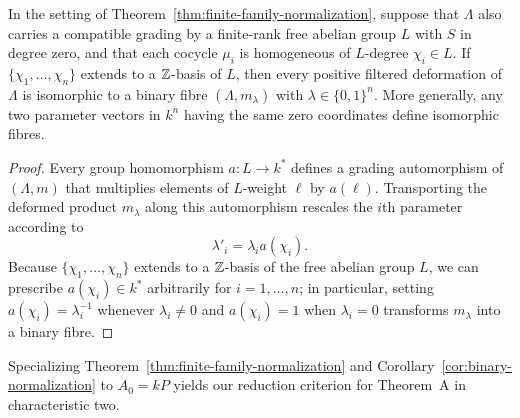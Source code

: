 \begin{corollary}
\label{cor:binary-normalization}
In the setting of Theorem~\ref{thm:finite-family-normalization}, suppose
that $\Lambda$ also carries a compatible grading by a finite-rank free
abelian group $L$ with $S$ in degree zero, and that each cocycle $\mu_i$ is
homogeneous of $L$-degree $\chi_i\in L$. If $\{\chi_1,\ldots,\chi_n\}$
extends to a $\mathbb Z$-basis of $L$, then every positive filtered deformation of
$\Lambda$ is isomorphic to a binary fibre $(\Lambda,m_\lambda)$ with
$\lambda\in\{0,1\}^n$. More generally, any two parameter vectors in $k^n$
having the same zero coordinates define isomorphic fibres.
\end{corollary}
\begin{proof}
Every group homomorphism $a:L\to k^*$ defines a grading automorphism of
$(\Lambda,m)$ that multiplies elements of $L$-weight $\ell$ by $a(\ell)$.
Transporting the deformed product $m_\lambda$ along this automorphism
rescales the $i$th parameter according to
\begin{equation}
                       \lambda'_i=\lambda_i a(\chi_i).
 \label{eq:diagonal-algebra-rescaling}
\end{equation}
Because $\{\chi_1,\ldots,\chi_n\}$ extends to a $\mathbb Z$-basis of the free
abelian group $L$, we can prescribe $a(\chi_i)\in k^*$ arbitrarily for
$i=1,\ldots,n$; in particular, setting $a(\chi_i)=\lambda_i^{-1}$ whenever
$\lambda_i\ne0$ and $a(\chi_i)=1$ when $\lambda_i=0$ transforms $m_\lambda$
into a binary fibre.
\end{proof}

Specializing Theorem~\ref{thm:finite-family-normalization} and
Corollary~\ref{cor:binary-normalization} to $A_0=kP$ yields our reduction
criterion for Theorem~A in characteristic two.

